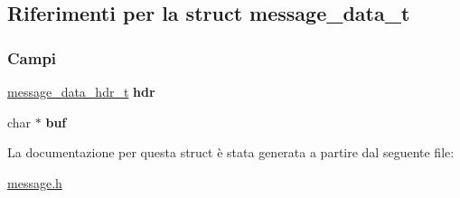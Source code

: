 \hypertarget{structmessage__data__t}{}\subsection{Riferimenti per la struct message\+\_\+data\+\_\+t}
\label{structmessage__data__t}
\subsubsection*{Campi}
\begin{DoxyCompactItemize}
\item 
\mbox{\label{structmessage__data__t_a45328b402174241b93bcefcdceca4545}} 
\mbox{\hyperlink{structmessage__data__hdr__t}{message\+\_\+data\+\_\+hdr\+\_\+t}} {\bfseries hdr}
\item 
\mbox{\label{structmessage__data__t_aba52694fd59a6cf8227b84b3cd1c30dd}} 
char $\ast$ {\bfseries buf}
\end{DoxyCompactItemize}


La documentazione per questa struct è stata generata a partire dal seguente file\+:\begin{DoxyCompactItemize}
\item 
\mbox{\hyperlink{message_8h}{message.\+h}}\end{DoxyCompactItemize}

